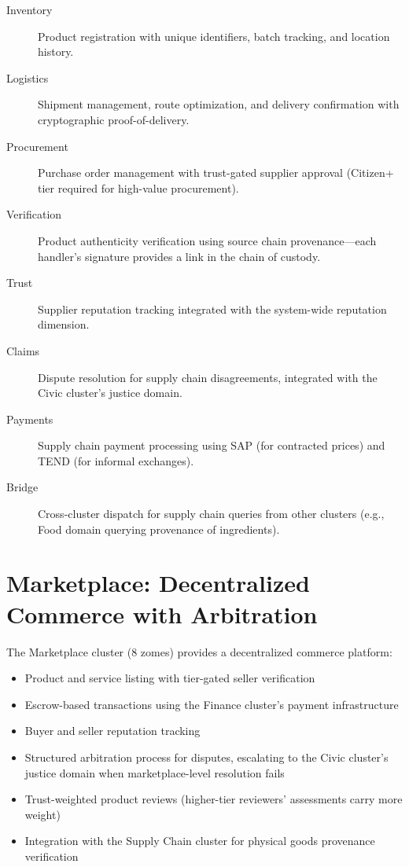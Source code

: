 \documentclass[12pt]{book}
\begin{document}
\begin{description}
  \item[Inventory] Product registration with unique identifiers, batch
    tracking, and location history.
  \item[Logistics] Shipment management, route optimization, and delivery
    confirmation with cryptographic proof-of-delivery.
  \item[Procurement] Purchase order management with trust-gated supplier
    approval (Citizen+ tier required for high-value procurement).
  \item[Verification] Product authenticity verification using source chain
    provenance---each handler's signature provides a link in the
    chain of custody.
  \item[Trust] Supplier reputation tracking integrated with the system-wide
    reputation dimension.
  \item[Claims] Dispute resolution for supply chain disagreements, integrated
    with the Civic cluster's justice domain.
  \item[Payments] Supply chain payment processing using SAP (for contracted
    prices) and TEND (for informal exchanges).
  \item[Bridge] Cross-cluster dispatch for supply chain queries from other
    clusters (e.g., Food domain querying provenance of ingredients).
\end{description}

\section{Marketplace: Decentralized Commerce with Arbitration}

The Marketplace cluster (8 zomes) provides a decentralized commerce platform:

\begin{itemize}
  \item Product and service listing with tier-gated seller verification
  \item Escrow-based transactions using the Finance cluster's payment
    infrastructure
  \item Buyer and seller reputation tracking
  \item Structured arbitration process for disputes, escalating to the
    Civic cluster's justice domain when marketplace-level resolution fails
  \item Trust-weighted product reviews (higher-tier reviewers' assessments
    carry more weight)
  \item Integration with the Supply Chain cluster for physical goods
    provenance verification
\end{itemize}
\end{document}
